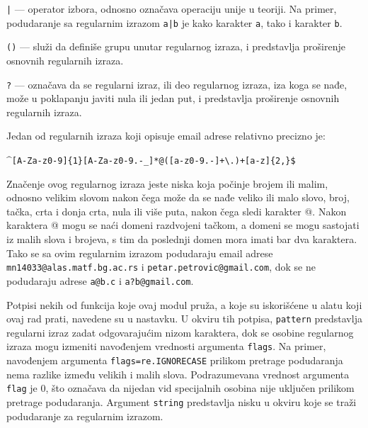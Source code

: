 \documentclass[12pt,oneside]{memoir}
\theoremstyle{plain}
\theoremstyle{definition}
\begin{document}
\begin{description}
	\item \texttt{|} --- operator izbora, odnosno označava operaciju unije u teoriji. Na primer, podudaranje sa regularnim izrazom \texttt{a|b} je kako karakter \texttt{a}, tako i karakter \texttt{b}.
	\item \texttt{()} --- služi da definiše grupu unutar regularnog izraza, i predstavlja proširenje osnovnih regularnih izraza.
	\item \texttt{?} --- označava da se regularni izraz, ili deo regularnog izraza, iza koga se nađe, može u poklapanju javiti nula ili jedan put, i predstavlja proširenje osnovnih regularnih izraza.
\end{description}

Jedan od regularnih izraza koji opisuje email adrese relativno precizno je: 
\begin{center}
\texttt{$\^$[A-Za-z0-9]\{1\}[A-Za-z0-9.-\_]*@([a-z0-9.-]+\textbackslash .)+[a-z]\{2,\}\$}
\end{center}
Značenje ovog regularnog izraza jeste niska koja počinje brojem ili malim, odnosno velikim slovom nakon čega može da se nađe veliko ili malo slovo, broj, tačka, crta i donja crta, nula ili više puta, nakon čega sledi karakter @. Nakon karaktera @ mogu se naći domeni razdvojeni tačkom, a domeni se mogu sastojati iz malih slova i brojeva, s tim da poslednji domen mora imati bar dva karaktera. Tako se sa ovim regularnim izrazom podudaraju email adrese \texttt{mn14033@alas.matf.bg.ac.rs} i \texttt{petar.petrovic@gmail.com}, dok se ne podudaraju adrese \texttt{a@b.c} i \texttt{a?b@gmail.com}.


Potpisi nekih od funkcija koje ovaj modul pruža, a koje su iskorišćene u alatu koji ovaj rad prati, navedene su u nastavku. U okviru tih potpisa, \texttt{pattern} predstavlja regularni izraz zadat odgovarajućim nizom karaktera, dok se osobine regularnog izraza mogu izmeniti navođenjem vrednosti argumenta \texttt{flags}. Na primer, navođenjem argumenta \texttt{flags=re.IGNORECASE} prilikom pretrage podudaranja nema razlike između velikih i malih slova. Podrazumevana vrednost argumenta \texttt{flag} je 0, što označava da nijedan vid specijalnih osobina nije uključen prilikom pretrage podudaranja. Argument \texttt{string} predstavlja nisku u okviru koje se traži podudaranje za regularnim izrazom.

\end{document}
